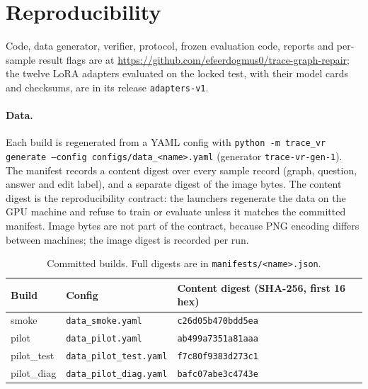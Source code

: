 \section{Reproducibility}
\label{sec:repro}

Code, data generator, verifier, protocol, frozen evaluation code, reports and per-sample result
flags are at \url{https://github.com/efeerdogmus0/trace-graph-repair}; the twelve LoRA adapters evaluated on
the locked test, with their model cards and checksums, are in its release \texttt{adapters-v1}.

\paragraph{Data.} Each build is regenerated from a YAML config with
\texttt{python -m trace\_vr generate --config configs/data\_<name>.yaml}
(generator \texttt{trace-vr-gen-1}). The manifest records a content digest over every sample record (graph,
question, answer and edit label), and a separate digest of the image bytes. The content digest
is the reproducibility contract: the launchers regenerate the data on the GPU machine and refuse
to train or evaluate unless it matches the committed manifest. Image bytes are not part of the
contract, because PNG encoding differs between machines; the image digest is recorded per run.

\begin{table}[h]
\centering\small
\begin{tabular}{@{}lll@{}}
\toprule
Build & Config & Content digest (SHA-256, first 16 hex) \\
\midrule
smoke & \texttt{data\_smoke.yaml} & \texttt{c26d05b470bdd5ea} \\
pilot & \texttt{data\_pilot.yaml} & \texttt{ab499a7351a81aaa} \\
pilot\_test & \texttt{data\_pilot\_test.yaml} & \texttt{f7c80f9383d273c1} \\
pilot\_diag & \texttt{data\_pilot\_diag.yaml} & \texttt{bafc07abe3c4743e} \\
\bottomrule
\end{tabular}
\caption{Committed builds. Full digests are in \texttt{manifests/<name>.json}.}
\label{tab:digests}
\end{table}

